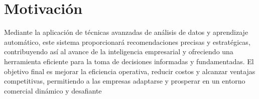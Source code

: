 




\section{Motivación}
Mediante la aplicación de técnicas avanzadas de análisis de datos y aprendizaje automático, este sistema proporcionará recomendaciones
precisas y estratégicas, contribuyendo así al avance de la inteligencia empresarial y ofreciendo una herramienta eficiente para la toma de
decisiones informadas y fundamentadas. El objetivo final es mejorar la
eficiencia operativa, reducir costos y alcanzar ventajas competitivas, permitiendo a las empresas adaptarse y prosperar en un entorno comercial dinámico y desafiante

